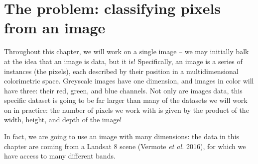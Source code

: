 \documentclass[
  letterpaper,
]{scrbook}
\begin{document}
\section{The problem: classifying pixels from an
image}\label{sec-clustering-data}

Throughout this chapter, we will work on a single image -- we may
initially balk at the idea that an image is data, but it is!
Specifically, an image is a series of instances (the pixels), each
described by their position in a multidimensional colorimetric space.
Greyscale images have one dimension, and images in color will have
three: their red, green, and blue channels. Not only are images data,
this specific dataset is going to be far larger than many of the
datasets we will work on in practice: the number of pixels we work with
is given by the product of the width, height, and depth of the image!

In fact, we are going to use an image with many dimensions: the data in
this chapter are coming from a Landsat 8 scene (Vermote \emph{et al.}
2016), for which we have access to many different bands.
\end{document}
